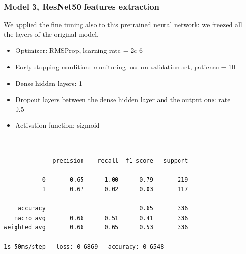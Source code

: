 \documentclass{article}
\begin{document}
\subsubsection{Model 3, ResNet50 features extraction}
We applied the fine tuning also to this pretrained neural network: we freezed all the layers of the original model.

\begin{itemize}
\item Optimizer: RMSProp, learning rate = 2e-6
\item Early stopping condition: monitoring loss on validation set, patience = 10
\item Dense hidden layers: 1
\item Dropout layers between the dense hidden layer and the output one: rate = 0.5
\item Activation function: sigmoid
\end{itemize}

\begin{verbatim}


              precision    recall  f1-score   support

           0       0.65      1.00      0.79       219
           1       0.67      0.02      0.03       117

    accuracy                           0.65       336
   macro avg       0.66      0.51      0.41       336
weighted avg       0.66      0.65      0.53       336

1s 50ms/step - loss: 0.6869 - accuracy: 0.6548

\end{verbatim}
\end{document}
